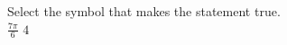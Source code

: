 \documentclass{ximera}
\author{David Kish}
\begin{document}
\begin{exercise}
Select the symbol that makes the statement true.\\
$\frac{7\pi}{6}$ \wordChoice{\choice[correct]{$<$}\choice{$>$}\choice{$=$}} $4$ 

\end{exercise}
\end{document}
